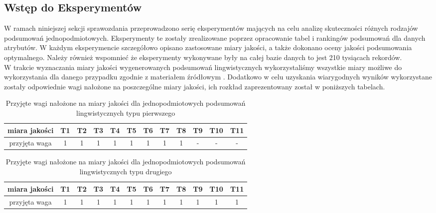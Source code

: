\documentclass{article}
\begin{document}
\subsection{Wstęp do Eksperymentów}

W ramach niniejszej sekcji sprawozdania przeprowadzono serię eksperymentów mających na celu analizę skuteczności różnych rodzajów podsumowań jednopodmiotowych. Eksperymenty te zostały zrealizowane poprzez opracowanie tabel i rankingów podsumowań dla danych atrybutów. W każdym eksperymencie szczegółowo opisano zastosowane miary jakości, a także dokonano oceny jakości podsumowania optymalnego. Należy również wspomnieć że eksperymenty wykonywane były na całej bazie danych to jest 210 tysiącach rekordów.\\

\noindent W trakcie wyznaczania miary jakości wygenerowanych podsumowań lingwistycznych wykorzystaliśmy wszystkie miary możliwe do wykorzystania dla danego przypadku zgodnie z materiałem źródłowym \cite{niewiadomski19}. Dodatkowo w celu uzyskania wiarygodnych wyników wykorzystane zostały odpowiednie wagi nałożone na poszczególne miary jakości, ich rozkład zaprezentowany został w poniższych tabelach.


\begin{table}[H]
    \centering
\caption{Przyjęte wagi nałożone na miary jakości dla jednopodmiotowych podsumowań lingwistycznych typu pierwszego}
\label{tab:my_label}
    \begin{tabular}{|c|c|c|c|c|c|c|c|c|c|c|c|} \hline
        miara jakości & T1 & T2 & T3 & T4 & T5 & T6 & T7 & T8 & T9 & T10 & T11\\ \hline
        przyjęta waga & 1 & 1 & 1 & 1 & 1 & 1 & 1 & 1 & - & - & -\\ \hline
    \end{tabular}
\end{table}

\begin{table}[H]
    \centering
\caption{Przyjęte wagi nałożone na miary jakości dla jednopodmiotowych podsumowań lingwistycznych typu drugiego}
\label{tab:my_label}
    \begin{tabular}{|c|c|c|c|c|c|c|c|c|c|c|c|} \hline
        miara jakości & T1 & T2 & T3 & T4 & T5 & T6 & T7 & T8 & T9 & T10 & T11\\ \hline
        przyjęta waga & 1 & 1 & 1 & 1 & 1 & 1 & 1 & 1 & 1 & 1 & 1\\ \hline
    \end{tabular}
\end{table}
\end{document}
